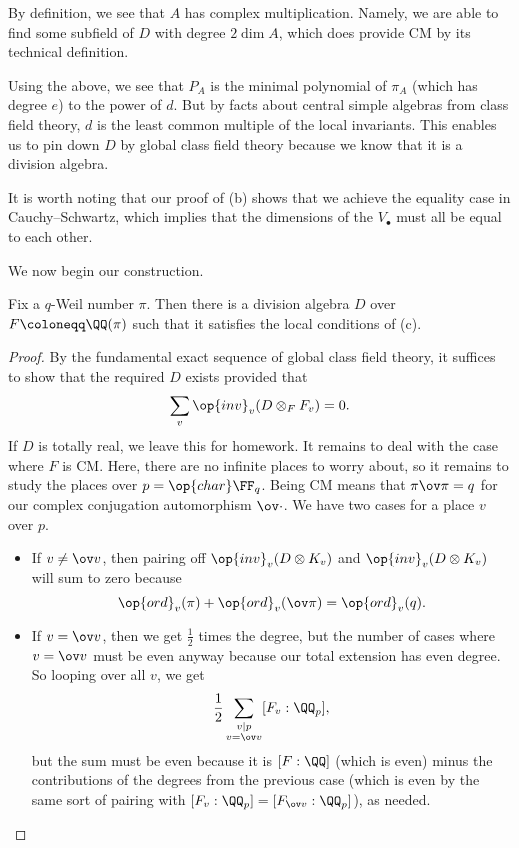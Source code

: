 \documentclass[../notes.tex]{subfiles}
\begin{document}
\begin{remark}
	By definition, we see that $A$ has complex multiplication. Namely, we are able to find some subfield of $D$ with degree $2\dim A$, which does provide CM by its technical definition.
\end{remark}
\begin{remark}
	Using the above, we see that $P_A$ is the minimal polynomial of $\pi_A$ (which has degree $e$) to the power of $d$. But by facts about central simple algebras from class field theory, $d$ is the least common multiple of the local invariants. This enables us to pin down $D$ by global class field theory because we know that it is a division algebra.
\end{remark}
\begin{remark}
	It is worth noting that our proof of (b) shows that we achieve the equality case in Cauchy--Schwartz, which implies that the dimensions of the $V_\bullet$ must all be equal to each other.
\end{remark}
We now begin our construction.
\begin{lemma}
	Fix a $q$-Weil number $\pi$. Then there is a division algebra $D$ over $F\coloneqq\QQ(\pi)$ such that it satisfies the local conditions of (c).
\end{lemma}
\begin{proof}
	By the fundamental exact sequence of global class field theory, it suffices to show that the required $D$ exists provided that
	\[\sum_v\op{inv}_v(D\otimes_FF_v)=0.\]
	If $D$ is totally real, we leave this for homework. It remains to deal with the case where $F$ is CM. Here, there are no infinite places to worry about, so it remains to study the places over $p=\op{char}\FF_q$. Being CM means that $\pi\ov\pi=q$ for our complex conjugation automorphism $\ov\cdot$. We have two cases for a place $v$ over $p$.
	\begin{itemize}
		\item If $v\ne\ov v$, then pairing off $\op{inv}_v(D\otimes K_v)$ and $\op{inv}_v(D\otimes K_v)$ will sum to zero because
		\[\op{ord}_v(\pi)+\op{ord}_v(\ov\pi)=\op{ord}_v(q).\]
		\item If $v=\ov v$, then we get $\frac12$ times the degree, but the number of cases where $v=\ov v$ must be even anyway because our total extension has even degree. So looping over all $v$, we get
		\[\frac12\sum_{\substack{v\mid p\\v=\ov v}}[F_v:\QQ_p],\]
		but the sum must be even because it is $[F:\QQ]$ (which is even) minus the contributions of the degrees from the previous case (which is even by the same sort of pairing with $[F_v:\QQ_p]=[F_{\ov v}:\QQ_p]$), as needed.
		\qedhere
	\end{itemize}
\end{proof}
\end{document}
